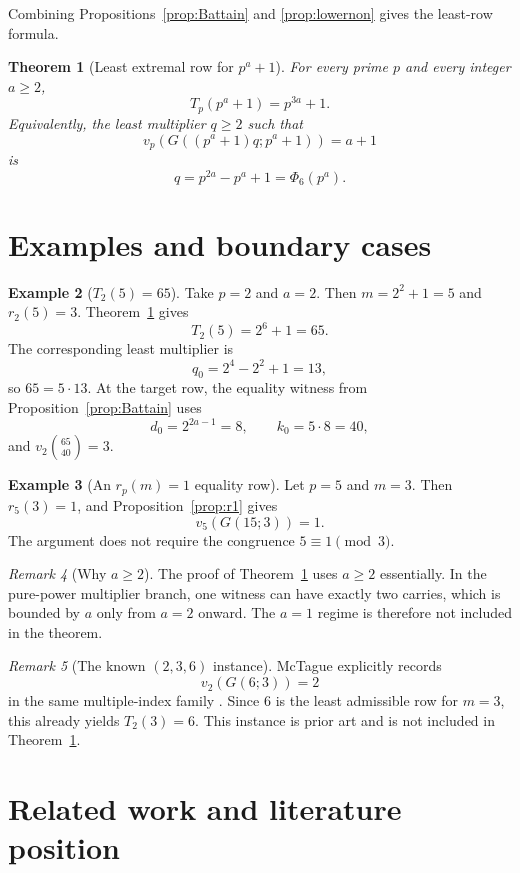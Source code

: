 \documentclass[11pt]{article}
\newtheorem{theorem}{Theorem}[section]
\theoremstyle{definition}
\newtheorem{example}[theorem]{Example}
\theoremstyle{remark}
\newtheorem{remark}[theorem]{Remark}
\begin{document}
Combining Propositions~\ref{prop:Battain} and \ref{prop:lowernon} gives the least-row formula.

\begin{theorem}[Least extremal row for $p^a+1$]\label{thm:B}
For every prime $p$ and every integer $a\ge2$,
\[
  \boxed{T_p(p^a+1)=p^{3a}+1.}
\]
Equivalently, the least multiplier $q\ge2$ such that
\[
  v_p(G((p^a+1)q;p^a+1))=a+1
\]
is
\[
  q=p^{2a}-p^a+1=\Phi_6(p^a).
\]
\end{theorem}

\section{Examples and boundary cases}\label{sec:examples}

\begin{example}[$T_2(5)=65$]
Take $p=2$ and $a=2$. Then $m=2^2+1=5$ and $r_2(5)=3$. Theorem~\ref{thm:B} gives
\[
  T_2(5)=2^6+1=65.
\]
The corresponding least multiplier is
\[
  q_0=2^4-2^2+1=13,
\]
so $65=5\cdot13$. At the target row, the equality witness from Proposition~\ref{prop:Battain} uses
\[
  d_0=2^{2a-1}=8,
  \qquad k_0=5\cdot8=40,
\]
and $v_2\binom{65}{40}=3$.
\end{example}

\begin{example}[An $r_p(m)=1$ equality row]
Let $p=5$ and $m=3$. Then $r_5(3)=1$, and Proposition~\ref{prop:r1} gives
\[
  v_5(G(15;3))=1.
\]
The argument does not require the congruence $5\equiv1\pmod3$.
\end{example}

\begin{remark}[Why $a\ge2$]
The proof of Theorem~\ref{thm:B} uses $a\ge2$ essentially. In the pure-power multiplier branch, one witness can have exactly two carries, which is bounded by $a$ only from $a=2$ onward. The $a=1$ regime is therefore not included in the theorem.
\end{remark}

\begin{remark}[The known $(2,3,6)$ instance]
McTague explicitly records
\[
  v_2(G(6;3))=2
\]
in the same multiple-index family \cite{McTague2017}. Since $6$ is the least admissible row for $m=3$, this already yields $T_2(3)=6$. This instance is prior art and is not included in Theorem~\ref{thm:B}.
\end{remark}

\section{Related work and literature position}\label{sec:related}
\end{document}
